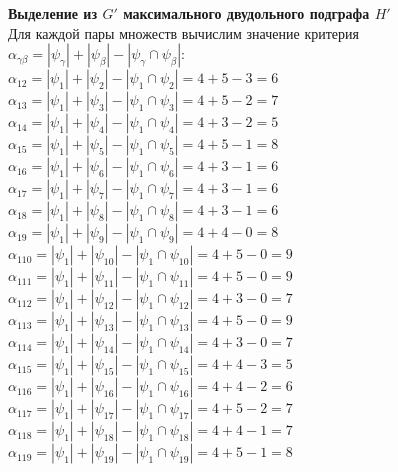 \documentclass[a4paper,12pt]{article}
\begin{document}
{ \large \centering \textbf{Выделение из $G'$ максимального двудольного подграфа $H'$} \\ }
\noindent
Для каждой пары множеств вычислим значение критерия $\alpha_{\gamma\beta} = |\psi_\gamma| + |\psi_\beta| - |\psi_\gamma \cap \psi_\beta|$:\\
$\alpha_{12} = |\psi_{1}| + |\psi_{2}| - |\psi_{1} \cap \psi_{2}| = 4 + 5 - 3 = 6$\\
$\alpha_{13} = |\psi_{1}| + |\psi_{3}| - |\psi_{1} \cap \psi_{3}| = 4 + 5 - 2 = 7$\\
$\alpha_{14} = |\psi_{1}| + |\psi_{4}| - |\psi_{1} \cap \psi_{4}| = 4 + 3 - 2 = 5$\\
$\alpha_{15} = |\psi_{1}| + |\psi_{5}| - |\psi_{1} \cap \psi_{5}| = 4 + 5 - 1 = 8$\\
$\alpha_{16} = |\psi_{1}| + |\psi_{6}| - |\psi_{1} \cap \psi_{6}| = 4 + 3 - 1 = 6$\\
$\alpha_{17} = |\psi_{1}| + |\psi_{7}| - |\psi_{1} \cap \psi_{7}| = 4 + 3 - 1 = 6$\\
$\alpha_{18} = |\psi_{1}| + |\psi_{8}| - |\psi_{1} \cap \psi_{8}| = 4 + 3 - 1 = 6$\\
$\alpha_{19} = |\psi_{1}| + |\psi_{9}| - |\psi_{1} \cap \psi_{9}| = 4 + 4 - 0 = 8$\\
$\alpha_{110} = |\psi_{1}| + |\psi_{10}| - |\psi_{1} \cap \psi_{10}| = 4 + 5 - 0 = 9$\\
$\alpha_{111} = |\psi_{1}| + |\psi_{11}| - |\psi_{1} \cap \psi_{11}| = 4 + 5 - 0 = 9$\\
$\alpha_{112} = |\psi_{1}| + |\psi_{12}| - |\psi_{1} \cap \psi_{12}| = 4 + 3 - 0 = 7$\\
$\alpha_{113} = |\psi_{1}| + |\psi_{13}| - |\psi_{1} \cap \psi_{13}| = 4 + 5 - 0 = 9$\\
$\alpha_{114} = |\psi_{1}| + |\psi_{14}| - |\psi_{1} \cap \psi_{14}| = 4 + 3 - 0 = 7$\\
$\alpha_{115} = |\psi_{1}| + |\psi_{15}| - |\psi_{1} \cap \psi_{15}| = 4 + 4 - 3 = 5$\\
$\alpha_{116} = |\psi_{1}| + |\psi_{16}| - |\psi_{1} \cap \psi_{16}| = 4 + 4 - 2 = 6$\\
$\alpha_{117} = |\psi_{1}| + |\psi_{17}| - |\psi_{1} \cap \psi_{17}| = 4 + 5 - 2 = 7$\\
$\alpha_{118} = |\psi_{1}| + |\psi_{18}| - |\psi_{1} \cap \psi_{18}| = 4 + 4 - 1 = 7$\\
$\alpha_{119} = |\psi_{1}| + |\psi_{19}| - |\psi_{1} \cap \psi_{19}| = 4 + 5 - 1 = 8$\\
\end{document}
